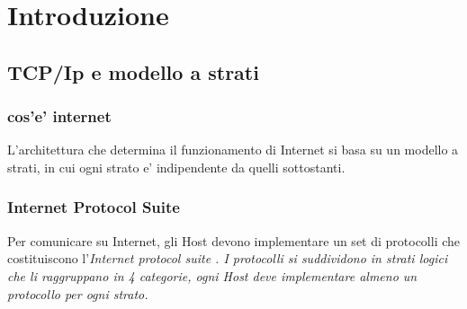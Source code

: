 
\chapter{Introduzione}


\section{TCP/Ip e modello a strati}


\subsection{cos'e' internet}


L'architettura che determina il funzionamento di Internet si basa su un modello a strati, in cui ogni strato e' indipendente da quelli sottostanti.

\subsection{Internet Protocol Suite}


Per comunicare su Internet, gli Host devono implementare un set di protocolli che costituiscono l'\it{Internet protocol suite} \cite{RFC_1122}. I protocolli si suddividono in strati logici che li raggruppano in 4 categorie, ogni Host deve implementare almeno un protocollo per ogni strato.


